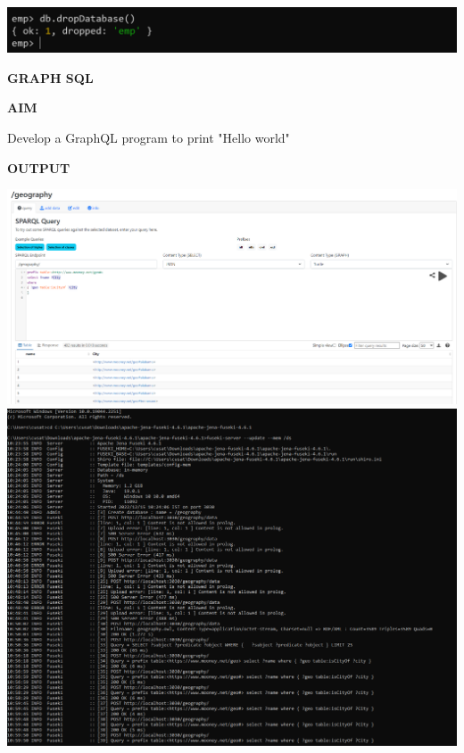 \documentclass[a4paper,12pt]{report}
\begin{document}
\includegraphics[scale=0.53]{M10.png}
\newpage
\begin{center}
\large\textbf{GRAPH SQL}
\end{center}

\begin{flushleft}
\textbf{AIM }
\end{flushleft}
Develop a GraphQL program to print "Hello world"

\begin{flushleft}
    \textbf{OUTPUT}
\end{flushleft}
\includegraphics[scale=0.4]{Screenshot 2022-12-15 161337.png}
\includegraphics[scale=0.4]{Screenshot 2022-12-15 161407.png}
\end{document}
